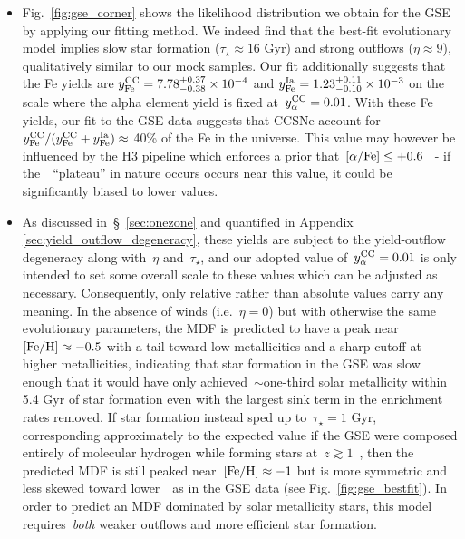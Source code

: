 \documentclass[ms.tex]{subfiles}
\begin{document}
\begin{itemize}
	\item Fig.~\ref{fig:gse_corner} shows the likelihood distribution we obtain
	for the GSE by applying our fitting method.
	We indeed find that the best-fit evolutionary model implies slow star
	formation ($\tau_\star \approx 16$ Gyr) and strong outflows
	($\eta \approx 9$), qualitatively similar to our mock samples.
	Our fit additionally suggests that the Fe yields are
	$y_\text{Fe}^\text{CC} = 7.78^{+0.37}_{-0.38}\times10^{-4}$ and
	$y_\text{Fe}^\text{Ia} = 1.23^{+0.11}_{-0.10}\times10^{-3}$ on the scale where the alpha
	element yield is fixed at~$y_\alpha^\text{CC} = 0.01$.
	With these Fe yields, our fit to the GSE data suggests that CCSNe account
	for~$y_\text{Fe}^\text{CC} / (y_\text{Fe}^\text{CC} + y_\text{Fe}^\text{Ia}) \approx$ 40\% of the Fe in the universe.
	This value may however be influenced by the H3 pipeline which enforces a
	prior that~$\text{[$\alpha$/Fe]} \leq +0.6$~\citep{Cargile2020} - if the~\afe~``plateau''
	in nature occurs occurs near this value, it could be significantly biased
	to lower values.

	\item As discussed in~\S~\ref{sec:onezone} and quantified in Appendix
	\ref{sec:yield_outflow_degeneracy}, these yields are subject to the
	yield-outflow degeneracy along with~$\eta$ and~$\tau_\star$, and our
	adopted value of~$y_\alpha^\text{CC} = 0.01$ is only intended to set some overall scale
	to these values which can be adjusted as necessary.
	Consequently, only relative rather than absolute values carry any meaning.
	In the absence of winds (i.e.~$\eta = 0$) but with otherwise the same
	evolutionary parameters, the MDF is predicted to have a peak
	near~$\text{[Fe/H]} \approx -0.5$ with a tail toward low metallicities and a
	sharp cutoff at higher metallicities, indicating that star formation in the
	GSE was slow enough that it would have only achieved~$\sim$one-third solar
	metallicity within 5.4 Gyr of star formation even with the largest sink
	term in the enrichment rates removed.
	If star formation instead sped up to~$\tau_\star = 1$ Gyr, corresponding
	approximately to the expected value if the GSE were composed entirely of
	molecular hydrogen while forming stars at~$z \gtrsim 1$~\citep{Tacconi2018},
	then the predicted MDF is still peaked near~$\text{[Fe/H]} \approx -1$ but is more
	symmetric and less skewed toward lower~\feh~as in the GSE data (see
	Fig.~\ref{fig:gse_bestfit}).
	In order to predict an MDF dominated by solar metallicity stars, this model
	requires~\textit{both} weaker outflows and more efficient star formation.


\end{itemize}
\end{document}
